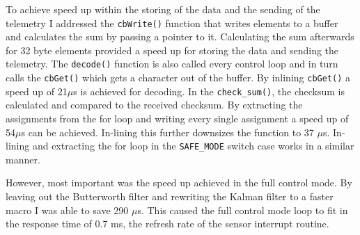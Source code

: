 \documentclass{article}
\begin{document}
To achieve speed up within the storing of the data and the sending of the telemetry I addressed the \texttt{cbWrite()} function that writes elements to a buffer and calculates the sum by passing a pointer to it. Calculating the sum afterwards for 32 byte elements provided a speed up for storing the data and sending the telemetry. 
The \texttt{decode()} function is also called every control loop and in turn calls the \texttt{cbGet()} which gets a character out of the buffer. By inlining \texttt{cbGet()} a speed up of 21$\mu$s is achieved for decoding. 
In the \texttt{check\_sum()}, the checksum is calculated and compared to the received checksum. By extracting the assignments from the for loop and writing every single assignment a speed up of 54$\mu$s can be achieved. In-lining this further downsizes the function to 37 $\mu$s. In-lining and extracting the for loop in the \texttt{SAFE\_MODE} switch case works in a similar manner. 

However, most important was the speed up achieved in the full control mode. By leaving out the Butterworth filter and rewriting the Kalman filter to a faster macro I was able to save 290 $\mu$s. This caused the full control mode loop to fit in the response time of 0.7 ms, the refresh rate of the sensor interrupt routine. 



%




%
%
\end{document}
